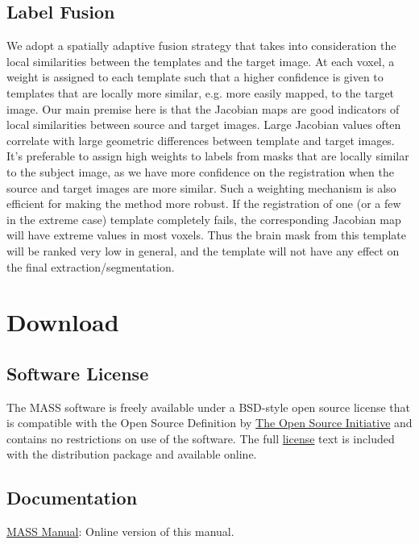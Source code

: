\documentclass[letterpaper,10pt,english]{sphinxhowto}
\begin{document}
\subsection{Label Fusion}
\label{about:label-fusion}
We adopt a spatially adaptive fusion strategy that takes into consideration
the local similarities between the templates and the target image. At
each voxel, a weight is assigned to each template such that a higher confidence
is given to templates that are locally more similar, e.g. more easily
mapped, to the target image. Our main premise here is that the Jacobian
maps are good indicators of local similarities between source and target images.
Large Jacobian values often correlate with large geometric differences
between template and target images. It’s preferable to assign high weights
to labels from masks that are locally similar to the subject image, as we
have more confidence on the registration when the source and target images
are more similar. Such a weighting mechanism is also efficient for making
the method more robust. If the registration of one (or a few in the extreme
case) template completely fails, the corresponding Jacobian map will have
extreme values in most voxels. Thus the brain mask from this template will
be ranked very low in general, and the template will not have any effect on
the final extraction/segmentation.
\pagebreak

\section{Download}
\label{download:download}\label{download::doc}

\subsection{Software License}
\label{download:software-license}
The MASS software is freely available under a BSD-style open source license that is compatible
with the Open Source Definition by \href{http://opensource.org/}{The Open Source Initiative} and contains no restrictions
on use of the software. The full \href{http://www.cbica.upenn.edu/sbia/software/license.html}{license} text is included with the distribution package and
available online.


\subsection{Documentation}
\label{download:documentation}\label{download:license}
\href{http://www.cbica.upenn.edu/sbia/software/mass/MASS\_Software\_Manual.pdf}{MASS Manual}:
Online version of this manual.
\end{document}
